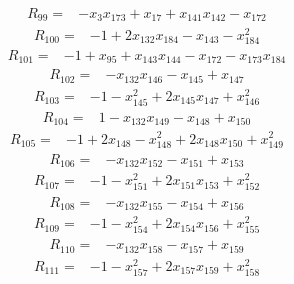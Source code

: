 {%
\begin{align*}
R_{99} ={}& -x_{3} x_{173} + x_{17} + x_{141} x_{142} - x_{172}
\end{align*}
\begin{align*}
R_{100} ={}& -1 + 2x_{132} x_{184} - x_{143} - x_{184}^{2}
\end{align*}
\begin{align*}
R_{101} ={}& -1 + x_{95} + x_{143} x_{144} - x_{172} - x_{173} x_{184}
\end{align*}
\begin{align*}
R_{102} ={}& -x_{132} x_{146} - x_{145} + x_{147}
\end{align*}
\begin{align*}
R_{103} ={}& -1 - x_{145}^{2} + 2x_{145} x_{147} + x_{146}^{2}
\end{align*}
\begin{align*}
R_{104} ={}& 1 - x_{132} x_{149} - x_{148} + x_{150}
\end{align*}
\begin{align*}
R_{105} ={}& -1 + 2x_{148} - x_{148}^{2} + 2x_{148} x_{150} + x_{149}^{2}
\end{align*}
\begin{align*}
R_{106} ={}& -x_{132} x_{152} - x_{151} + x_{153}
\end{align*}
\begin{align*}
R_{107} ={}& -1 - x_{151}^{2} + 2x_{151} x_{153} + x_{152}^{2}
\end{align*}
\begin{align*}
R_{108} ={}& -x_{132} x_{155} - x_{154} + x_{156}
\end{align*}
\begin{align*}
R_{109} ={}& -1 - x_{154}^{2} + 2x_{154} x_{156} + x_{155}^{2}
\end{align*}
\begin{align*}
R_{110} ={}& -x_{132} x_{158} - x_{157} + x_{159}
\end{align*}
\begin{align*}
R_{111} ={}& -1 - x_{157}^{2} + 2x_{157} x_{159} + x_{158}^{2}

\end{align*}}
